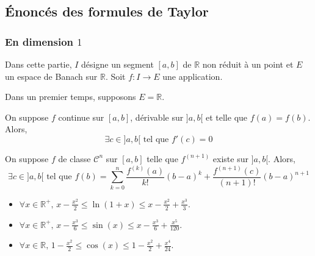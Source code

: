 




  \subsection{Énoncés des formules de Taylor}

  \subsubsection{En dimension \texorpdfstring{$1$}{1}}


  Dans cette partie, $I$ désigne un segment $[a,b]$ de $\mathbb{R}$ non réduit à un point et $E$ un espace de Banach sur $\mathbb{R}$. Soit $f : I \rightarrow E$ une application.

  Dans un premier temps, supposons $E = \mathbb{R}$.

  \begin{theorem}[Rolle]
    \label{218-1}
    On suppose $f$ continue sur $[a,b]$, dérivable sur $]a,b[$ et telle que $f(a) = f(b)$. Alors,
    \[ \exists c \in ]a,b[ \text{ tel que } f'(c) = 0 \]
  \end{theorem}

  \begin{theorem}
    On suppose $f$ de classe $\mathcal{C}^n$ sur $[a,b]$ telle que $f^{(n+1)}$ existe sur $]a,b[$. Alors,
    \[ \exists c \in ]a,b[ \text{ tel que } f(b) = \sum_{k=0}^{n} \frac{f^{(k)} (a)}{k!} (b-a)^k + \frac{f^{(n+1)}(c)}{(n+1)!} (b-a)^{n+1} \]
  \end{theorem}

  \begin{application}
    \begin{itemize}
      \item $\forall x \in \mathbb{R}^+, \, x - \frac{x^2}{2} \leq \ln(1+x) \leq x - \frac{x^2}{2} + \frac{x^3}{3}$.
      \item $\forall x \in \mathbb{R}^+, \, x - \frac{x^3}{6} \leq \sin(x) \leq x - \frac{x^3}{6} + \frac{x^5}{120}$.
      \item $\forall x \in \mathbb{R}, \, 1 - \frac{x^2}{2} \leq \cos(x) \leq 1 - \frac{x^2}{2} + \frac{x^4}{24}$.
    \end{itemize}
  \end{application}

